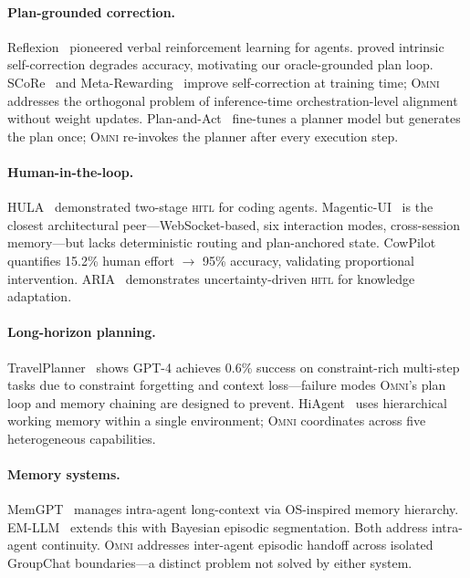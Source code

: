 \documentclass[11pt,a4paper]{article}
\newcommand{\omni}{\textsc{Omni}}
\newcommand{\hitl}{\textsc{hitl}}
\begin{document}
\paragraph{Plan-grounded correction.} Reflexion~\cite{shinn2023reflexion} pioneered verbal reinforcement learning for agents. \citet{huang2024llms} proved intrinsic self-correction degrades accuracy, motivating our oracle-grounded plan loop. SCoRe~\cite{kumar2024score} and Meta-Rewarding~\cite{yuan2024metarewarding} improve self-correction at training time; \omni{} addresses the orthogonal problem of inference-time orchestration-level alignment without weight updates. Plan-and-Act~\cite{planandact2025} fine-tunes a planner model but generates the plan once; \omni{} re-invokes the planner after every execution step.

\paragraph{Human-in-the-loop.} HULA~\cite{rasheed2024hula} demonstrated two-stage \hitl{} for coding agents. Magentic-UI~\cite{microsoft2025magenticui} is the closest architectural peer---WebSocket-based, six interaction modes, cross-session memory---but lacks deterministic routing and plan-anchored state. CowPilot~\cite{cowpilot2025} quantifies 15.2\% human effort $\to$ 95\% accuracy, validating proportional intervention. ARIA~\cite{aria2025} demonstrates uncertainty-driven \hitl{} for knowledge adaptation.

\paragraph{Long-horizon planning.} TravelPlanner~\cite{xie2024travelplanner} shows GPT-4 achieves 0.6\% success on constraint-rich multi-step tasks due to constraint forgetting and context loss---failure modes \omni{}'s plan loop and memory chaining are designed to prevent. HiAgent~\cite{hiagent2024} uses hierarchical working memory within a single environment; \omni{} coordinates across five heterogeneous capabilities.

\paragraph{Memory systems.} MemGPT~\cite{packer2023memgpt} manages intra-agent long-context via OS-inspired memory hierarchy. EM-LLM~\cite{fountas2024emllm} extends this with Bayesian episodic segmentation. Both address intra-agent continuity. \omni{} addresses inter-agent episodic handoff across isolated GroupChat boundaries---a distinct problem not solved by either system.
\end{document}
